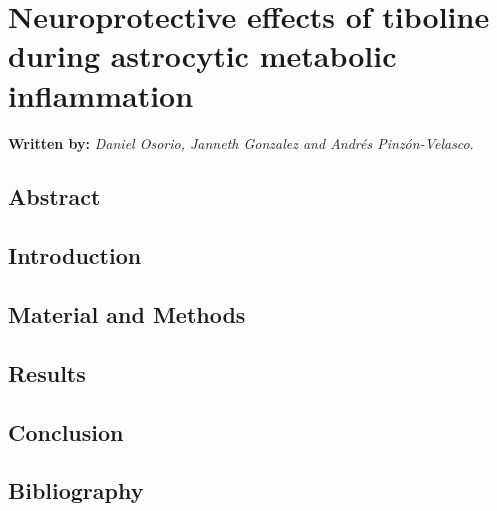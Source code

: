 \chapter{Neuroprotective effects of tiboline during astrocytic metabolic inflammation}
\textbf{Written by:} \textit{Daniel Osorio, Janneth Gonzalez and Andrés Pinzón-Velasco}.\\
\section{Abstract}
\section{Introduction}
\section{Material and Methods}
\section{Results}
\section{Conclusion}
\section{Bibliography}

